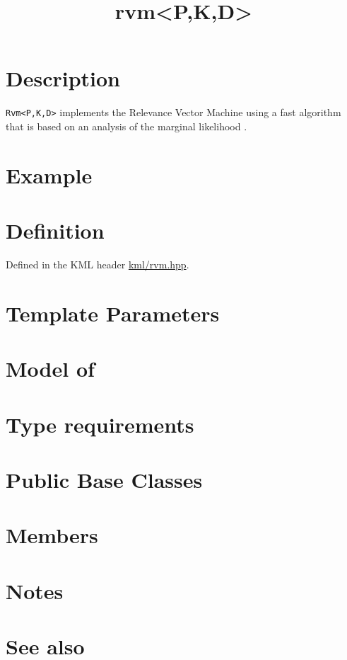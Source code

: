 \documentclass{article}
\begin{document}
\title{rvm<P,K,D>}
\maketitle

\section*{Description}

\texttt{Rvm<P,K,D>} implements the Relevance Vector Machine \cite{tipping00relevance,tipping01sparse}
using a fast algorithm \cite{tipping03fast}
that is based on an analysis of the marginal likelihood \cite{faul02analysis}.


\section*{Example}
\section*{Definition}

Defined in the KML header \href{\kmlsvnroot/kml/rvm.hpp}{kml/rvm.hpp}.

\section*{Template Parameters}
\section*{Model of}
\section*{Type requirements}
\section*{Public Base Classes}
\section*{Members}
\section*{Notes}
\section*{See also}



\end{document}
